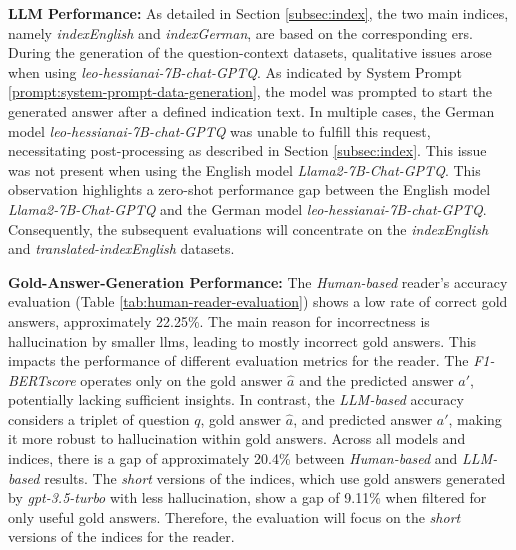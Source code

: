 \vspace{\baselineskip}
\noindent\textbf{LLM Performance:} As detailed in Section \ref{subsec:index}, the two main indices, namely \textit{indexEnglish} and \textit{indexGerman}, are based on the corresponding \gls{er}s. During the generation of the question-context datasets, qualitative issues arose when using \textit{leo-hessianai-7B-chat-GPTQ}. As indicated by System Prompt \ref{prompt:system-prompt-data-generation}, the model was prompted to start the generated answer after a defined indication text. In multiple cases, the German model \textit{leo-hessianai-7B-chat-GPTQ} was unable to fulfill this request, necessitating post-processing as described in Section \ref{subsec:index}. This issue was not present when using the English model \textit{Llama2-7B-Chat-GPTQ}. This observation highlights a zero-shot performance gap between the English model \textit{Llama2-7B-Chat-GPTQ} and the German model \textit{leo-hessianai-7B-chat-GPTQ}. Consequently, the subsequent evaluations will concentrate on the \textit{indexEnglish} and \textit{translated-indexEnglish} datasets.

\vspace{\baselineskip}
\noindent\textbf{Gold-Answer-Generation Performance:} The \textit{Human-based} reader's accuracy evaluation (Table \ref{tab:human-reader-evaluation}) shows a low rate of correct gold answers, approximately 22.25\%. The main reason for incorrectness is hallucination by smaller \gls{llm}s, leading to mostly incorrect gold answers. This impacts the performance of different evaluation metrics for the reader. The \textit{F1-BERTscore} operates only on the gold answer $\hat{a}$ and the predicted answer $a'$, potentially lacking sufficient insights. In contrast, the \textit{LLM-based} accuracy considers a triplet of question $q$, gold answer $\hat{a}$, and predicted answer $a'$, making it more robust to hallucination within gold answers. Across all models and indices, there is a gap of approximately 20.4\% between \textit{Human-based} and \textit{LLM-based} results. The \textit{short} versions of the indices, which use gold answers generated by \textit{gpt-3.5-turbo} with less hallucination, show a gap of 9.11\% when filtered for only useful gold answers. Therefore, the evaluation will focus on the \textit{short} versions of the indices for the reader.

